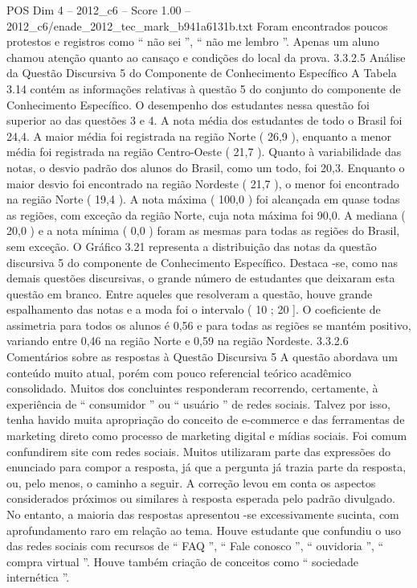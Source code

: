 \begin{textsample}{POS Dim 4 – 2012\_c6 – Score 1.00 – 2012\_c6/enade\_2012\_tec\_mark\_b941a6131b.txt}
Foram encontrados poucos protestos e registros como “ não sei ”, “ não me lembro ”.
Apenas um aluno chamou atenção quanto ao cansaço e condições do local da prova. 3.3.2.5 Análise da Questão Discursiva 5 do Componente de Conhecimento Específico A Tabela 3.14 contém as informações relativas à questão 5 do conjunto do componente de Conhecimento Específico.
O desempenho dos estudantes nessa questão foi superior ao das questões 3 e 4.
A nota média dos estudantes de todo o Brasil foi 24,4.
A maior média foi registrada na região Norte ( 26,9 ), enquanto a menor média foi registrada na região Centro-Oeste ( 21,7 ).
Quanto à variabilidade das notas, o desvio padrão dos alunos do Brasil, como um todo, foi 20,3.
Enquanto o maior desvio foi encontrado na região Nordeste ( 21,7 ), o menor foi encontrado na região Norte ( 19,4 ).
A nota máxima ( 100,0 ) foi alcançada em quase todas as regiões, com exceção da região Norte, cuja nota máxima foi 90,0.
A mediana ( 20,0 ) e a nota mínima ( 0,0 ) foram as mesmas para todas as regiões do Brasil, sem exceção.
O Gráfico 3.21 representa a distribuição das notas da questão discursiva 5 do componente de Conhecimento Específico.
Destaca -se, como nas demais questões discursivas, o grande número de estudantes que deixaram esta questão em branco.
Entre aqueles que resolveram a questão, houve grande espalhamento das notas e a moda foi o intervalo ( 10 ; 20 ].
O coeficiente de assimetria para todos os alunos é 0,56 e para todas as regiões se mantém positivo, variando entre 0,46 na região Norte e 0,59 na região Nordeste. 3.3.2.6 Comentários sobre as respostas à Questão Discursiva 5 A questão abordava um conteúdo muito atual, porém com pouco referencial teórico acadêmico consolidado.
Muitos dos concluintes responderam recorrendo, certamente, à experiência de “ consumidor ” ou “ usuário ” de redes sociais.
Talvez por isso, tenha havido muita apropriação do conceito de e-commerce e das ferramentas de marketing direto como processo de marketing digital e mídias sociais.
Foi comum confundirem site com redes sociais.
Muitos utilizaram parte das expressões do enunciado para compor a resposta, já que a pergunta já trazia parte da resposta, ou, pelo menos, o caminho a seguir.
A correção levou em conta os aspectos considerados próximos ou similares à resposta esperada pelo padrão divulgado.
No entanto, a maioria das respostas apresentou -se excessivamente sucinta, com aprofundamento raro em relação ao tema.
Houve estudante que confundiu o uso das redes sociais com recursos de “ FAQ ”, “ Fale conosco ”, “ ouvidoria ”, “ compra virtual ”.
Houve também criação de conceitos como “ sociedade internética ”.

\end{textsample}

